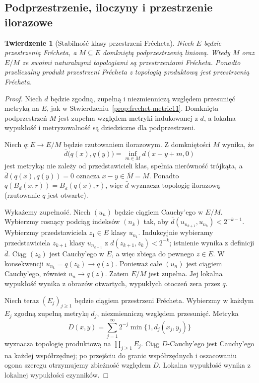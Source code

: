 \documentclass[11pt,a4paper]{article}
\numberwithin{equation}{section}
\theoremstyle{plain}
\newtheorem{twierdzenie}{Twierdzenie}[section]
\theoremstyle{definition}
\theoremstyle{remark}
\begin{document}
\subsection{Podprzestrzenie, iloczyny i przestrzenie ilorazowe}

\begin{twierdzenie}[Stabilność klasy przestrzeni Frécheta]\label{thm:frechet-stability11}
Niech $E$ będzie przestrzenią Frécheta, a $M\subseteq E$
domkniętą podprzestrzenią liniową. Wtedy $M$ oraz $E/M$
ze swoimi naturalnymi topologiami są przestrzeniami Frécheta.
Ponadto przeliczalny produkt przestrzeni Frécheta z topologią
produktową jest przestrzenią Frécheta.
\end{twierdzenie}
\begin{proof}
Niech $d$ będzie zgodną, zupełną i niezmienniczą względem
przesunięć metryką na $E$, jak w Stwierdzeniu~\ref{prop:frechet-metric11}.
Domknięta podprzestrzeń $M$ jest zupełna względem metryki
indukowanej z $d$, a lokalna wypukłość i metryzowalność są
dziedziczne dla podprzestrzeni.

Niech $q:E\to E/M$ będzie rzutowaniem ilorazowym.
Z domkniętości $M$ wynika, że
\[
 \bar d\bigl(q(x),q(y)\bigr)=\inf_{m\in M}d(x-y+m,0)
\]
jest metryką: nie zależy od przedstawicieli klas, spełnia
nierówność trójkąta, a $\bar d(q(x),q(y))=0$ oznacza
$x-y\in\overline M=M$. Ponadto
$q(B_d(x,r))=B_{\bar d}(q(x),r)$, więc $\bar d$ wyznacza
topologię ilorazową (rzutowanie $q$ jest otwarte).

Wykażemy zupełność. Niech $(u_n)$ będzie ciągiem Cauchy'ego
w $E/M$. Wybierzmy rosnący podciąg indeksów $(n_k)$ tak,
aby $\bar d(u_{n_{k+1}},u_{n_k})<2^{-k-1}$.
Wybierzmy przedstawiciela $z_1\in E$ klasy $u_{n_1}$.
Indukcyjnie wybieramy przedstawiciela $z_{k+1}$ klasy
$u_{n_{k+1}}$ z $d(z_{k+1},z_k)<2^{-k}$;
istnienie wynika z definicji $\bar d$. Ciąg $(z_k)$
jest Cauchy'ego w $E$, a więc zbiega do pewnego $z\in E$.
W konsekwencji $u_{n_k}=q(z_k)\to q(z)$.
Ponieważ całe $(u_n)$ jest ciągiem Cauchy'ego,
również $u_n\to q(z)$. Zatem $E/M$ jest zupełna.
Jej lokalna wypukłość wynika z obrazów otwartych,
wypukłych otoczeń zera przez $q$.

Niech teraz $(E_j)_{j\ge1}$ będzie ciągiem przestrzeni Frécheta.
Wybierzmy w każdym $E_j$ zgodną zupełną metrykę
$d_j$, niezmienniczą względem przesunięć. Metryka
\[
 D(x,y)=\sum_{j=1}^\infty 2^{-j}\min\{1,d_j(x_j,y_j)\}
\]
wyznacza topologię produktową na $\prod_{j\ge1}E_j$.
Ciąg $D$-Cauchy'ego jest Cauchy'ego na każdej współrzędnej;
po przejściu do granic współrzędnych i oszacowaniu ogona szeregu
otrzymujemy zbieżność względem $D$. Lokalna wypukłość
wynika z lokalnej wypukłości czynników.
\end{proof}
\end{document}
